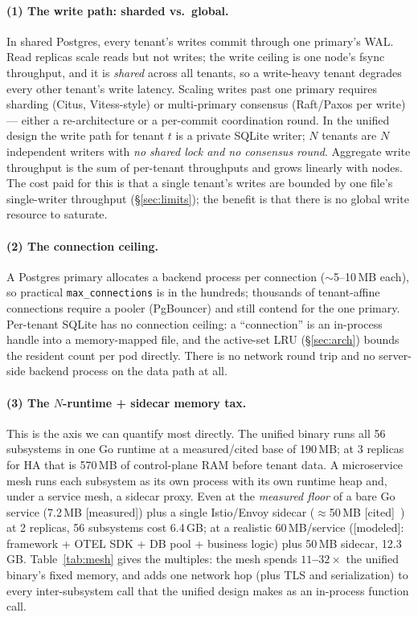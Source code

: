 \documentclass[11pt]{article}
\newcommand{\meas}{\textcolor{blue!60!black}{\small[measured]}}
\newcommand{\modeled}{\textcolor{orange!70!black}{\small[modeled]}}
\newcommand{\cited}{\textcolor{purple!70!black}{\small[cited]}}
\begin{document}
\paragraph{(1) The write path: sharded vs.\ global.}
In shared Postgres, every tenant's writes commit through one primary's WAL. Read replicas scale
reads but not writes; the write ceiling is one node's fsync throughput, and it is \emph{shared}
across all tenants, so a write-heavy tenant degrades every other tenant's write latency. Scaling
writes past one primary requires sharding (Citus, Vitess-style) or multi-primary consensus
(Raft/Paxos per write) --- either a re-architecture or a per-commit coordination round. In the
unified design the write path for tenant $t$ is a private SQLite writer; $N$ tenants are $N$
independent writers with \emph{no shared lock and no consensus round}. Aggregate write
throughput is the sum of per-tenant throughputs and grows linearly with nodes. The cost paid for
this is that a single tenant's writes are bounded by one file's single-writer throughput
(\S\ref{sec:limits}); the benefit is that there is no global write resource to saturate.

\paragraph{(2) The connection ceiling.}
A Postgres primary allocates a backend process per connection ($\sim$5--10\,MB each), so
practical \texttt{max\_connections} is in the hundreds; thousands of tenant-affine connections
require a pooler (PgBouncer) and still contend for the one primary. Per-tenant SQLite has no
connection ceiling: a ``connection'' is an in-process handle into a memory-mapped file, and the
active-set LRU (\S\ref{sec:arch}) bounds the resident count per pod directly. There is no network
round trip and no server-side backend process on the data path at all.

\paragraph{(3) The $N$-runtime + sidecar memory tax.}
This is the axis we can quantify most directly. The unified binary runs all 56 subsystems in one
Go runtime at a measured/cited base of 190\,MB; at 3 replicas for HA that is 570\,MB of
control-plane RAM before tenant data. A microservice mesh runs each subsystem as its own process
with its own runtime heap and, under a service mesh, a sidecar proxy. Even at the \emph{measured
floor} of a bare Go service (7.2\,MB \meas{}) plus a single Istio/Envoy sidecar
($\approx$50\,MB \cited~\cite{istio}) at 2 replicas, 56 subsystems cost 6.4\,GB; at a realistic
60\,MB/service (\modeled{}: framework + OTEL SDK + DB pool + business logic) plus 50\,MB sidecar,
12.3\,GB. Table~\ref{tab:mesh} gives the multiples: the mesh spends
\textbf{$11$--$32\times$} the unified binary's fixed memory, and adds one network hop (plus TLS
and serialization) to every inter-subsystem call that the unified design makes as an in-process
function call.
\end{document}
